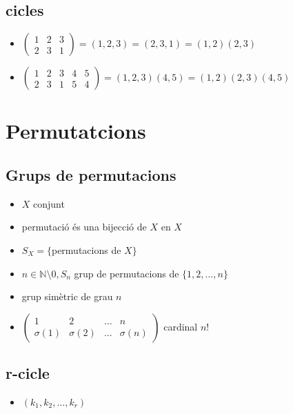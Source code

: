 \documentclass{article}
\newcommand{\N}{\mathbb{N}}
\begin{document}
\subsection{cicles}
\begin{itemize}
\item $\begin{pmatrix}1&2&3\\2&3&1\end{pmatrix} = (1, 2, 3) = (2, 3, 1) = (1, 2)(2, 3)$
\item $\begin{pmatrix}1&2&3&4&5\\2&3&1&5&4\end{pmatrix} = (1, 2, 3)(4, 5) = (1, 2)(2, 3)(4, 5)$
\end{itemize}


\section{Permutatcions}
\subsection{Grups de permutacions}
\begin{itemize}
\item $X$ conjunt
\item permutació és una bijecció de $X$ en $X$
\item $S_X = \{$permutacions de $X\}$
\item $n \in \N\setminus 0, S_n$ grup de permutacions de $\{1, 2,\dots , n\}$
\item grup simètric de grau $n$
\item $\begin{pmatrix}1 & 2 & \dots & n\\ \sigma(1) & \sigma(2) & \dots & \sigma(n)\end{pmatrix}$ cardinal $n!$
\end{itemize}
\subsection{r-cicle}
\begin{itemize}
\item $(k_1, k_2, \dots, k_r)$
\end{itemize}
\end{document}
